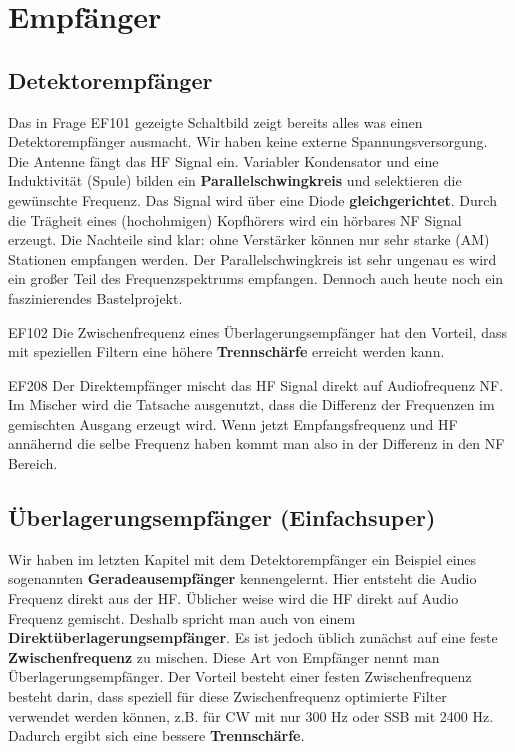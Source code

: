 \setcounter{section}{9}
\section{Empfänger}
\subsection{Detektorempfänger}
\begin{ohmchapter}
  Das in Frage EF101 gezeigte Schaltbild zeigt bereits alles was einen Detektorempfänger ausmacht. Wir haben keine externe Spannungsversorgung. Die Antenne fängt das HF Signal ein. Variabler Kondensator und eine Induktivität (Spule) bilden ein \textbf{Parallelschwingkreis} und selektieren die gewünschte Frequenz.
  Das Signal wird über eine Diode \textbf{gleichgerichtet}. Durch die Trägheit eines (hochohmigen) Kopfhörers wird ein hörbares NF Signal erzeugt.
  Die Nachteile sind klar: ohne Verstärker können nur sehr starke (AM) Stationen empfangen werden. Der Parallelschwingkreis ist sehr ungenau es wird ein großer Teil des Frequenzspektrums empfangen.
   Dennoch auch heute noch ein faszinierendes Bastelprojekt.
  
\end{ohmchapter}  


\begin{sol}{EF102}
  Die Zwischenfrequenz eines Überlagerungsempfänger hat den Vorteil, dass mit speziellen Filtern eine höhere \textbf{Trennschärfe} erreicht werden kann.
\end{sol} 

\begin{sol}{EF208}
 Der Direktempfänger mischt das HF Signal direkt auf Audiofrequenz NF. Im Mischer wird die Tatsache ausgenutzt, dass die Differenz der Frequenzen im gemischten Ausgang erzeugt wird. 
 Wenn jetzt Empfangsfrequenz und HF annähernd die selbe Frequenz haben kommt man also in der Differenz in den NF Bereich.
\end{sol} 


\subsection{Überlagerungsempfänger (Einfachsuper)}
\begin{ohmchapter}
  Wir haben im letzten Kapitel mit dem Detektorempfänger ein Beispiel eines sogenannten \textbf{Geradeausempfänger} kennengelernt.
  Hier entsteht die Audio Frequenz direkt aus der HF. 
  Üblicher weise wird die HF direkt auf Audio Frequenz gemischt. Deshalb spricht man auch von einem \textbf{Direktüberlagerungsempfänger}.
  Es ist jedoch üblich zunächst auf eine feste \textbf{Zwischenfrequenz} zu mischen. Diese Art von Empfänger nennt man Überlagerungsempfänger.
  Der Vorteil besteht einer festen Zwischenfrequenz besteht darin, dass speziell für diese Zwischenfrequenz optimierte Filter verwendet werden können, z.B. für CW mit nur 300 Hz oder SSB mit 2400 Hz. Dadurch ergibt sich eine bessere \textbf{Trennschärfe}.
  \par
\end{ohmchapter}  
